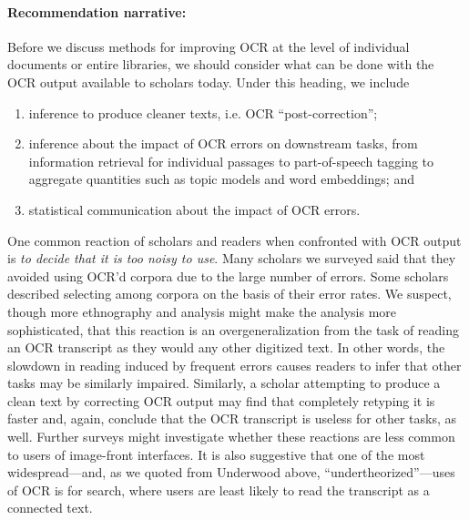 \documentclass[twoside,11pt]{report}
\begin{document}
\paragraph{Recommendation narrative:}

Before we discuss methods for improving OCR at the level of individual documents or entire libraries, we should consider what can be done with the OCR output available to scholars today. Under this heading, we include
\begin{enumerate}

\item inference to produce cleaner texts, i.e. OCR ``post-correction'';

\item inference about the impact of OCR errors on downstream tasks, from information retrieval for individual passages to part-of-speech tagging to aggregate quantities such as topic models and word embeddings; and

\item statistical communication about the impact of OCR errors.

\end{enumerate}

One common reaction of scholars and readers when confronted with OCR output is \emph{to decide that it is too noisy to use}. Many scholars we surveyed said that they avoided using OCR'd corpora due to the large number of errors. Some scholars described selecting among corpora on the basis of their error rates. We suspect, though more ethnography and analysis might make the analysis more sophisticated, that this reaction is an overgeneralization from the task of reading an OCR transcript as they would any other digitized text. In other words, the slowdown in reading induced by frequent errors causes readers to infer that other tasks may be similarly impaired. Similarly, a scholar attempting to produce a clean text by correcting OCR output may find that completely retyping it is faster and, again, conclude that the OCR transcript is useless for other tasks, as well. Further surveys might investigate whether these reactions are less common to users of image-front interfaces. It is also suggestive that one of the most widespread---and, as we quoted from Underwood above, ``undertheorized''---uses of OCR is for search, where users are least likely to read the transcript as a connected text.
\end{document}
